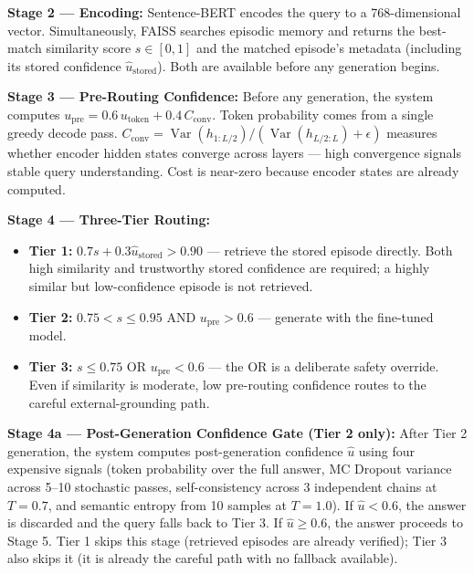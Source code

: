 \documentclass[12pt,a4paper]{article}
\theoremstyle{definition}
\newcommand{\upre}{u_{\text{pre}}}
\newcommand{\uhat}{\hat{u}}
\newcommand{\ustored}{\hat{u}_{\text{stored}}}
\newcommand{\Cconv}{C_{\text{conv}}}
\begin{document}
\textbf{Stage 2 — Encoding:} Sentence-BERT encodes the query to a 768-dimensional vector. Simultaneously, FAISS searches episodic memory and returns the best-match similarity score $s \in [0,1]$ and the matched episode's metadata (including its stored confidence $\ustored$). Both are available before any generation begins.

\textbf{Stage 3 — Pre-Routing Confidence:} Before any generation, the system computes $\upre = 0.6\,u_{\text{token}} + 0.4\,\Cconv$. Token probability comes from a single greedy decode pass. $\Cconv = \operatorname{Var}(h_{1:L/2}) / (\operatorname{Var}(h_{L/2:L}) + \epsilon)$ measures whether encoder hidden states converge across layers — high convergence signals stable query understanding. Cost is near-zero because encoder states are already computed.

\textbf{Stage 4 — Three-Tier Routing:}
\begin{itemize}
    \item \textbf{Tier 1:} $0.7s + 0.3\ustored > 0.90$ — retrieve the stored episode directly. Both high similarity and trustworthy stored confidence are required; a highly similar but low-confidence episode is not retrieved.
    \item \textbf{Tier 2:} $0.75 < s \leq 0.95$ AND $\upre > 0.6$ — generate with the fine-tuned model.
    \item \textbf{Tier 3:} $s \leq 0.75$ OR $\upre < 0.6$ — the OR is a deliberate safety override. Even if similarity is moderate, low pre-routing confidence routes to the careful external-grounding path.
\end{itemize}

\textbf{Stage 4a — Post-Generation Confidence Gate (Tier 2 only):} After Tier 2 generation, the system computes post-generation confidence $\uhat$ using four expensive signals (token probability over the full answer, MC Dropout variance across 5--10 stochastic passes, self-consistency across 3 independent chains at $T=0.7$, and semantic entropy from 10 samples at $T=1.0$). If $\uhat < 0.6$, the answer is discarded and the query falls back to Tier 3. If $\uhat \geq 0.6$, the answer proceeds to Stage 5. Tier 1 skips this stage (retrieved episodes are already verified); Tier 3 also skips it (it is already the careful path with no fallback available).
\end{document}
